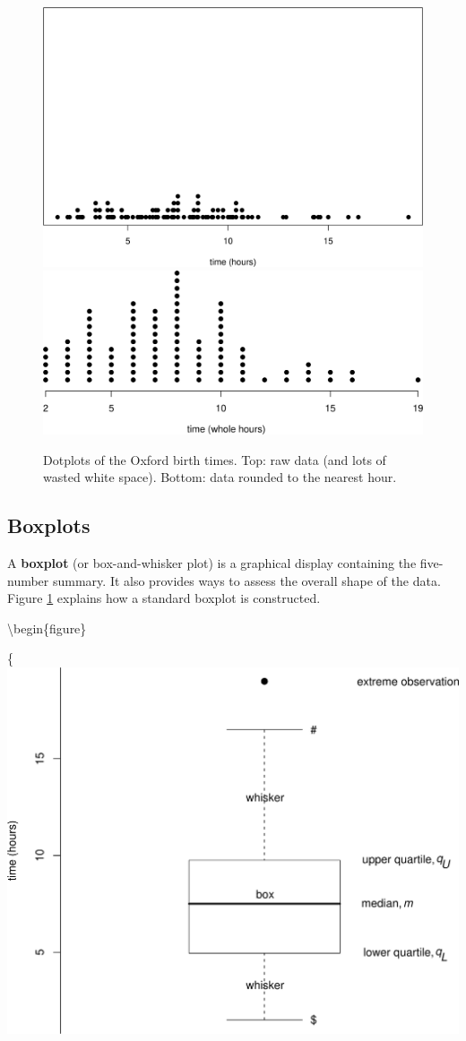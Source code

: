 \documentclass[
  british,
]{book}
\begin{document}
\begin{figure}

{\centering \includegraphics[width=0.8\linewidth]{images/ox_dot_basic} \includegraphics[width=0.8\linewidth]{images/ox_dot_adv} 

}

\caption{Dotplots of the Oxford birth times. Top: raw data (and lots of wasted white space).  Bottom: data rounded to the nearest hour.}\label{fig:oxdotbasic}
\end{figure}
\FloatBarrier

\hypertarget{boxplots}{%
\subsection{Boxplots}\label{boxplots}}

A \textbf{boxplot} (or box-and-whisker plot) is a graphical display containing the five-number summary. It also provides ways to assess the overall shape of the data. Figure \ref{fig:oxdotbasic} explains how a standard boxplot is constructed.

\textbackslash begin\{figure\}

\{\centering \includegraphics[width=0.8\linewidth]{images/ox_box_basic}
\end{document}
